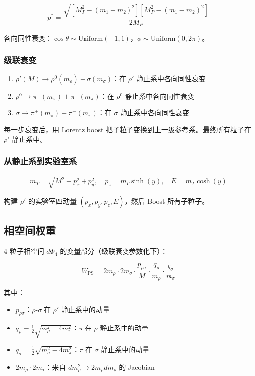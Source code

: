 \documentclass[11pt,a4paper,UTF8]{ctexart}
\begin{document}
\[
p^* = \frac{\sqrt{[M_P^2 - (m_1+m_2)^2][M_P^2 - (m_1-m_2)^2]}}{2M_P}
\]

各向同性衰变：$\cos\theta \sim \text{Uniform}(-1,1)$，$\phi \sim \text{Uniform}(0, 2\pi)$。

\subsubsection{级联衰变}

\begin{enumerate}[leftmargin=2em]
    \item $\rho'(M) \to \rho^0(m_\rho) + \sigma(m_\sigma)$：在 $\rho'$ 静止系中各向同性衰变
    \item $\rho^0 \to \pi^+(m_\pi) + \pi^-(m_\pi)$：在 $\rho^0$ 静止系中各向同性衰变
    \item $\sigma \to \pi^+(m_\pi) + \pi^-(m_\pi)$：在 $\sigma$ 静止系中各向同性衰变
\end{enumerate}

每一步衰变后，用 Lorentz boost 把子粒子变换到上一级参考系。最终所有粒子在 $\rho'$ 静止系中。

\subsubsection{从静止系到实验室系}

\[
m_T = \sqrt{M^2 + p_x^2 + p_y^2}, \quad p_z = m_T \sinh(y), \quad E = m_T \cosh(y)
\]

构建 $\rho'$ 的实验室四动量 $(p_x, p_y, p_z, E)$，然后 Boost 所有子粒子。

\subsection{相空间权重}

4 粒子相空间 $d\Phi_4$ 的变量部分（级联衰变参数化下）：

\[
W_{\text{PS}} = 2m_\rho \cdot 2m_\sigma \cdot \frac{p_{\rho\sigma}}{M} \cdot \frac{q_\rho}{m_\rho} \cdot \frac{q_\sigma}{m_\sigma}
\]

其中：
\begin{itemize}[leftmargin=2em]
    \item $p_{\rho\sigma}$：$\rho$-$\sigma$ 在 $\rho'$ 静止系中的动量
    \item $q_\rho = \frac{1}{2}\sqrt{m_\rho^2 - 4m_\pi^2}$：$\pi$ 在 $\rho$ 静止系中的动量
    \item $q_\sigma = \frac{1}{2}\sqrt{m_\sigma^2 - 4m_\pi^2}$：$\pi$ 在 $\sigma$ 静止系中的动量
    \item $2m_\rho \cdot 2m_\sigma$：来自 $dm_\rho^2 \to 2m_\rho dm_\rho$ 的 Jacobian
\end{itemize}
\end{document}
